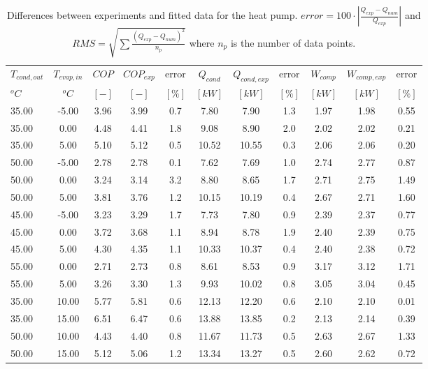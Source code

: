 \documentclass[english]{SPFShortReport}
\begin{document}
\begin{table}[!ht]
\begin{small}
\caption{Differences between experiments and fitted data for the heat pump.          $error=100 \cdot |\frac{Q_{exp}-Q_{num}}{Q_{exp}}|$ and $RMS = \sqrt { \sum{\frac{(Q_{exp}-Q_{num})^2}{n_p}} }$ where $n_p$ is the number of data points.}
\begin{center}
\resizebox{12cm}{!} 
{
\begin{tabular}{l | c c c c c c c c c c } 
\hline
\hline
$T_{cond,out}$ &$T_{evap,in}$ &$COP$ &$COP_{exp}$ &error &$Q_{cond}$ &$Q_{cond,exp}$ &error &$W_{comp}$ &$W_{comp,exp}$ &error \\ 
$^oC$ &$^oC$ &$[-]$ &$[-]$ &$[\%]$ &$[kW]$ &$[kW]$ &$[\%]$ &$[kW]$ &$[kW]$ &$[\%]$\\ 
\hline
35.00  & -5.00 & 3.96 & 3.99 & 0.7 & 7.80 & 7.90 & 1.3 & 1.97 & 1.98 & 0.55\\ 
35.00  & 0.00 & 4.48 & 4.41 & 1.8 & 9.08 & 8.90 & 2.0 & 2.02 & 2.02 & 0.21\\ 
35.00  & 5.00 & 5.10 & 5.12 & 0.5 & 10.52 & 10.55 & 0.3 & 2.06 & 2.06 & 0.20\\ 
50.00  & -5.00 & 2.78 & 2.78 & 0.1 & 7.62 & 7.69 & 1.0 & 2.74 & 2.77 & 0.87\\ 
50.00  & 0.00 & 3.24 & 3.14 & 3.2 & 8.80 & 8.65 & 1.7 & 2.71 & 2.75 & 1.49\\ 
50.00  & 5.00 & 3.81 & 3.76 & 1.2 & 10.15 & 10.19 & 0.4 & 2.67 & 2.71 & 1.60\\ 
45.00  & -5.00 & 3.23 & 3.29 & 1.7 & 7.73 & 7.80 & 0.9 & 2.39 & 2.37 & 0.77\\ 
45.00  & 0.00 & 3.72 & 3.68 & 1.1 & 8.94 & 8.78 & 1.9 & 2.40 & 2.39 & 0.75\\ 
45.00  & 5.00 & 4.30 & 4.35 & 1.1 & 10.33 & 10.37 & 0.4 & 2.40 & 2.38 & 0.72\\ 
55.00  & 0.00 & 2.71 & 2.73 & 0.8 & 8.61 & 8.53 & 0.9 & 3.17 & 3.12 & 1.71\\ 
55.00  & 5.00 & 3.26 & 3.30 & 1.3 & 9.93 & 10.02 & 0.8 & 3.05 & 3.04 & 0.45\\ 
35.00  & 10.00 & 5.77 & 5.81 & 0.6 & 12.13 & 12.20 & 0.6 & 2.10 & 2.10 & 0.01\\ 
35.00  & 15.00 & 6.51 & 6.47 & 0.6 & 13.88 & 13.85 & 0.2 & 2.13 & 2.14 & 0.39\\ 
50.00  & 10.00 & 4.43 & 4.40 & 0.8 & 11.67 & 11.73 & 0.5 & 2.63 & 2.67 & 1.33\\ 
50.00  & 15.00 & 5.12 & 5.06 & 1.2 & 13.34 & 13.27 & 0.5 & 2.60 & 2.62 & 0.72\\ 

\end{tabular}}
\end{center}
\end{small}
\end{table}
\end{document}
